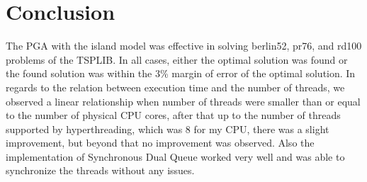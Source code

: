 \documentclass[10pt,journal,compsoc]{IEEEtran}
\begin{document}




\section{Conclusion}
The PGA with the island model was effective in solving berlin52, pr76, and rd100 problems of the TSPLIB. In all cases, either the optimal solution was found or the found solution was within the 3\% margin of error of the optimal solution. In regards to the relation between execution time and the number of threads, we observed a linear relationship when number of threads were smaller than or equal to the number of physical CPU cores, after that up to the number of threads supported by hyperthreading, which was 8 for my CPU, there was a slight improvement, but beyond that no improvement was observed. Also the implementation of Synchronous Dual Queue worked very well and was able to synchronize the threads without any issues.






%
\end{document}
